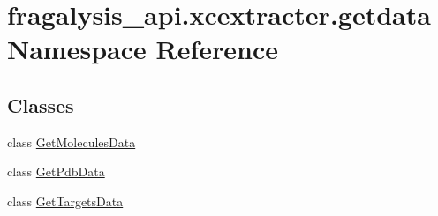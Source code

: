 \hypertarget{namespacefragalysis__api_1_1xcextracter_1_1getdata}{}\section{fragalysis\+\_\+api.\+xcextracter.\+getdata Namespace Reference}
\label{namespacefragalysis__api_1_1xcextracter_1_1getdata}
\subsection*{Classes}
\begin{DoxyCompactItemize}
\item 
class \hyperlink{classfragalysis__api_1_1xcextracter_1_1getdata_1_1_get_molecules_data}{Get\+Molecules\+Data}
\item 
class \hyperlink{classfragalysis__api_1_1xcextracter_1_1getdata_1_1_get_pdb_data}{Get\+Pdb\+Data}
\item 
class \hyperlink{classfragalysis__api_1_1xcextracter_1_1getdata_1_1_get_targets_data}{Get\+Targets\+Data}
\end{DoxyCompactItemize}
